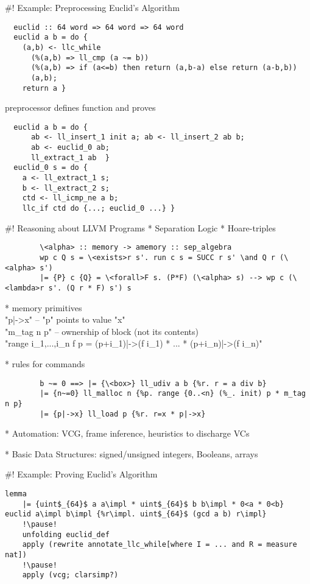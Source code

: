\documentclass[fleqn]{beamer}
\begin{document}
#! Example: Preprocessing Euclid's Algorithm
  \small
  \begin{lstlisting}
  euclid :: 64 word => 64 word => 64 word
  euclid a b = do {
    (a,b) <- llc_while
      (%(a,b) => ll_cmp (a ~= b))
      (%(a,b) => if (a<=b) then return (a,b-a) else return (a-b,b))
      (a,b);
    return a }
  \end{lstlisting}
  \pause
  preprocessor defines function  and proves
  \begin{lstlisting}
  euclid a b = do {
      ab <- ll_insert_1 init a; ab <- ll_insert_2 ab b;
      ab <- euclid_0 ab;
      ll_extract_1 ab  }
  euclid_0 s = do {
    a <- ll_extract_1 s;
    b <- ll_extract_2 s;
    ctd <- ll_icmp_ne a b;
    llc_if ctd do {...; euclid_0 ...} }
  \end{lstlisting}

#! Reasoning about LLVM Programs
  * Separation Logic
    * Hoare-triples
      \begin{lstlisting}
        \<alpha> :: memory -> amemory :: sep_algebra
        wp c Q s = \<exists>r s'. run c s = SUCC r s' \and Q r (\<alpha> s')
        |= {P} c {Q} = \<forall>F s. (P*F) (\<alpha> s) --> wp c (\<lambda>r s'. (Q r * F) s') s
      \end{lstlisting}

    \pause
    * memory primitives\\
      \is"p|->x" -- \is"p" points to value \is"x"\\
      \is"m_tag n p" -- ownership of block (not its contents)\\[1em]
      \is"range {i_1,...,i_n} f p = (p+i_1)|->(f i_1) * ... * (p+i_n)|->(f i_n)"

    \pause
    * rules for commands
      \begin{lstlisting}
        b ~= 0 ==> |= {\<box>} ll_udiv a b {%r. r = a div b}
        |= {n~=0} ll_malloc n {%p. range {0..<n} (%_. init) p * m_tag n p}
        |= {p|->x} ll_load p {%r. r=x * p|->x}
      \end{lstlisting}

  \pause
  * Automation: VCG, frame inference, heuristics to discharge VCs

  \pause
  * Basic Data Structures: signed/unsigned integers, Booleans, arrays

#! Example: Proving Euclid's Algorithm
  \small
  \begin{lstlisting}[escapechar=!]
    lemma
    |= {uint$_{64}$ a a\impl * uint$_{64}$ b b\impl * 0<a * 0<b} euclid a\impl b\impl {%r\impl. uint$_{64}$ (gcd a b) r\impl}
    !\pause!
    unfolding euclid_def
    apply (rewrite annotate_llc_while[where I = ... and R = measure nat])
    !\pause!
    apply (vcg; clarsimp?)
  \end{lstlisting}
  \pause
\end{document}
